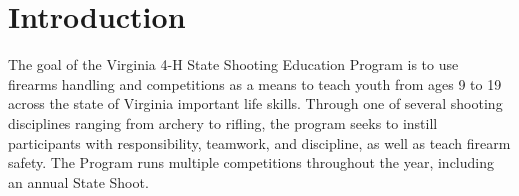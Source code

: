 \documentclass[sigconf]{acmart}
\begin{document}
%
%


\maketitle

\section{Introduction} %

The goal of the Virginia 4-H State Shooting Education Program is to use firearms handling and competitions as a means to teach youth from ages 9 to 19 across the state of Virginia important life skills. Through one of several shooting disciplines ranging from archery to rifling, the program seeks to instill participants with responsibility, teamwork, and discipline, as well as teach firearm safety. The Program runs multiple competitions throughout the year, including an annual State Shoot. 
\end{document}
